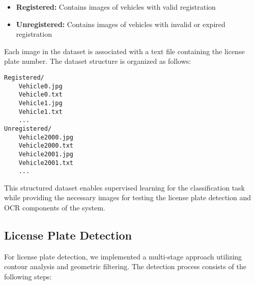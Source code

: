 \documentclass[conference]{IEEEtran}
\begin{document}
\begin{itemize}
    \item \textbf{Registered:} Contains images of vehicles with valid registration
    \item \textbf{Unregistered:} Contains images of vehicles with invalid or expired registration
\end{itemize}

Each image in the dataset is associated with a text file containing the license plate number. The dataset structure is organized as follows:

\begin{lstlisting}
Registered/
    Vehicle0.jpg
    Vehicle0.txt
    Vehicle1.jpg
    Vehicle1.txt
    ...
Unregistered/
    Vehicle2000.jpg
    Vehicle2000.txt
    Vehicle2001.jpg
    Vehicle2001.txt
    ...
\end{lstlisting}

This structured dataset enables supervised learning for the classification task while providing the necessary images for testing the license plate detection and OCR components of the system.

\subsection{License Plate Detection}
For license plate detection, we implemented a multi-stage approach utilizing contour analysis and geometric filtering. The detection process consists of the following steps:
\end{document}
